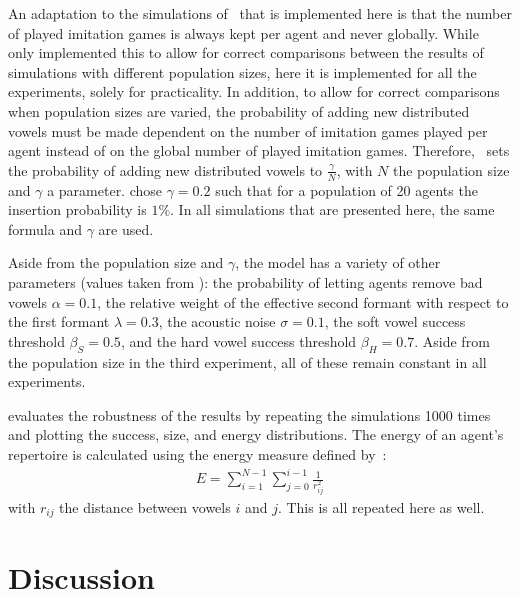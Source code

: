 \documentclass{article}
\begin{document}
An adaptation to the simulations of~ that is
implemented here is that the number of played imitation games is always kept per agent and never globally.
While~ only implemented this to allow for correct comparisons
between the results of simulations with different population sizes, here it is implemented for all the experiments, solely for practicality.
In addition, to allow for correct comparisons when population sizes are varied, the probability of adding new distributed vowels must be made dependent on the
number of imitation games played per agent instead of on the global number of played imitation games. Therefore,~
sets the probability of adding new distributed vowels to $\frac{\gamma}{N}$, with $N$ the population size and $\gamma$ a parameter.
 chose $\gamma=0.2$ such that for a population of 20 agents the insertion probability is $1\%$.
In all simulations that are presented here, the same formula and $\gamma$ are used.

Aside from the population size and $\gamma$, the model has a variety of other parameters (values taken from ): the probability of letting agents
remove bad vowels $\alpha=0.1$, the relative weight of the effective second formant with respect to the first formant $\lambda=0.3$, the acoustic noise $\sigma=0.1$, the soft vowel success
threshold $\beta_S=0.5$, and the hard vowel success threshold $\beta_H=0.7$.
Aside from the population size in the third experiment, all of these remain constant in all experiments.

 evaluates the robustness of
the results by repeating the simulations 1000 times and plotting the success, size, and energy distributions.
The energy of an agent's repertoire is calculated using the energy measure defined by~:
\begin{align}
    E = \sum^{N-1}_{i=1}\sum^{i-1}_{j=0} \frac{1}{r_{ij}^2}
\end{align}
with $r_{ij}$ the distance between vowels $i$ and $j$.
This is all repeated here as well.

\section{Discussion\label{sec:discus}}
\end{document}
